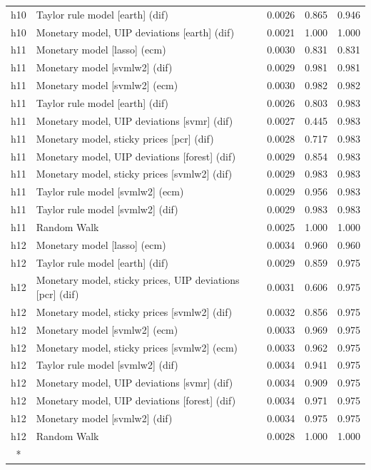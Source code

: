 \begin{ThreePartTable}
\begin{longtable}[t]{cp{5.5cm}ccc}
h10 & \raggedright Taylor rule model [earth] (dif) & 0.0026 & 0.865 & 0.946\\
h10 & \raggedright Monetary model, UIP deviations [earth] (dif) & 0.0021 & 1.000 & 1.000\\
\addlinespace
h11 & \raggedright Monetary model [lasso] (ecm) & 0.0030 & 0.831 & 0.831\\
h11 & \raggedright Monetary model [svmlw2] (dif) & 0.0029 & 0.981 & 0.981\\
h11 & \raggedright Monetary model [svmlw2] (ecm) & 0.0030 & 0.982 & 0.982\\
h11 & \raggedright Taylor rule model [earth] (dif) & 0.0026 & 0.803 & 0.983\\
h11 & \raggedright Monetary model, UIP deviations [svmr] (dif) & 0.0027 & 0.445 & 0.983\\
h11 & \raggedright Monetary model, sticky prices [pcr] (dif) & 0.0028 & 0.717 & 0.983\\
h11 & \raggedright Monetary model, UIP deviations [forest] (dif) & 0.0029 & 0.854 & 0.983\\
h11 & \raggedright Monetary model, sticky prices [svmlw2] (dif) & 0.0029 & 0.983 & 0.983\\
h11 & \raggedright Taylor rule model [svmlw2] (ecm) & 0.0029 & 0.956 & 0.983\\
h11 & \raggedright Taylor rule model [svmlw2] (dif) & 0.0029 & 0.983 & 0.983\\
h11 & \raggedright Random Walk & 0.0025 & 1.000 & 1.000\\
\addlinespace
h12 & \raggedright Monetary model [lasso] (ecm) & 0.0034 & 0.960 & 0.960\\
h12 & \raggedright Taylor rule model [earth] (dif) & 0.0029 & 0.859 & 0.975\\
h12 & \raggedright Monetary model, sticky prices, UIP deviations [pcr] (dif) & 0.0031 & 0.606 & 0.975\\
h12 & \raggedright Monetary model, sticky prices [svmlw2] (dif) & 0.0032 & 0.856 & 0.975\\
h12 & \raggedright Monetary model [svmlw2] (ecm) & 0.0033 & 0.969 & 0.975\\
h12 & \raggedright Monetary model, sticky prices [svmlw2] (ecm) & 0.0033 & 0.962 & 0.975\\
h12 & \raggedright Taylor rule model [svmlw2] (dif) & 0.0034 & 0.941 & 0.975\\
h12 & \raggedright Monetary model, UIP deviations [svmr] (dif) & 0.0034 & 0.909 & 0.975\\
h12 & \raggedright Monetary model, UIP deviations [forest] (dif) & 0.0034 & 0.971 & 0.975\\
h12 & \raggedright Monetary model [svmlw2] (dif) & 0.0034 & 0.975 & 0.975\\
h12 & \raggedright Random Walk & 0.0028 & 1.000 & 1.000\\*
\end{longtable}
\end{ThreePartTable}
\endgroup{}
